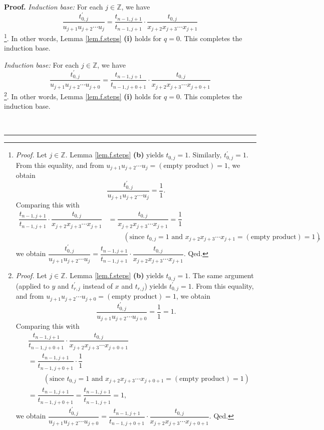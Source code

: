 \documentclass[numbers=enddot,12pt,final,onecolumn,notitlepage]{scrartcl}%
\theoremstyle{definition}
\newenvironment{proof}[1][Proof]{\noindent\textbf{#1.} }{\ \rule{0.5em}{0.5em}}
\newenvironment{verlong}{}{}
\newenvironment{vershort}{}{}
\begin{document}
\begin{proof}
\begin{vershort}
\textit{Induction base:} For each $j\in\mathbb{Z}$, we have%
\[
\dfrac{t_{0,j}^{\prime}}{u_{j+1}u_{j+2}\cdots u_{j}}=\dfrac{t_{n-1,j+1}%
}{t_{n-1,j+1}}\cdot\dfrac{t_{0,j}}{x_{j+2}x_{j+3}\cdots x_{j+1}}%
\]
\footnote{\textit{Proof.} Let $j\in\mathbb{Z}$. Lemma \ref{lem.f.steps}
\textbf{(b)} yields $t_{0,j}=1$. Similarly, $t_{0,j}^{\prime}=1$. From this
equality, and from $u_{j+1}u_{j+2}\cdots u_{j}=\left(  \text{empty
product}\right)  =1$, we obtain%
\[
\dfrac{t_{0,j}^{\prime}}{u_{j+1}u_{j+2}\cdots u_{j}}=\dfrac{1}{1}.
\]
Comparing this with%
\begin{align*}
\dfrac{t_{n-1,j+1}}{t_{n-1,j+1}}\cdot\dfrac{t_{0,j}}{x_{j+2}x_{j+3}\cdots
x_{j+1}}  &  =\dfrac{t_{0,j}}{x_{j+2}x_{j+3}\cdots x_{j+1}}=\dfrac{1}{1}\\
&  \ \ \ \ \ \ \ \ \ \ \left(  \text{since }t_{0,j}=1\text{ and }%
x_{j+2}x_{j+3}\cdots x_{j+1}=\left(  \text{empty product}\right)  =1\right)  ,
\end{align*}
we obtain $\dfrac{t_{0,j}^{\prime}}{u_{j+1}u_{j+2}\cdots u_{j}}=\dfrac
{t_{n-1,j+1}}{t_{n-1,j+1}}\cdot\dfrac{t_{0,j}}{x_{j+2}x_{j+3}\cdots x_{j+1}}$.
Qed.}. In other words, Lemma \ref{lem.f.steps} \textbf{(i)} holds for $q=0$.
This completes the induction base.
\end{vershort}

\begin{verlong}
\textit{Induction base:} For each $j\in\mathbb{Z}$, we have%
\[
\dfrac{t_{0,j}^{\prime}}{u_{j+1}u_{j+2}\cdots u_{j+0}}=\dfrac{t_{n-1,j+1}%
}{t_{n-1,j+0+1}}\cdot\dfrac{t_{0,j}}{x_{j+2}x_{j+3}\cdots x_{j+0+1}}%
\]
\footnote{\textit{Proof.} Let $j\in\mathbb{Z}$. Lemma \ref{lem.f.steps}
\textbf{(b)} yields $t_{0,j}=1$. The same argument (applied to $y$ and
$t_{r,j}^{\prime}$ instead of $x$ and $t_{r,j}$) yields $t_{0,j}^{\prime}=1$.
From this equality, and from $u_{j+1}u_{j+2}\cdots u_{j+0}=\left(  \text{empty
product}\right)  =1$, we obtain%
\[
\dfrac{t_{0,j}^{\prime}}{u_{j+1}u_{j+2}\cdots u_{j+0}}=\dfrac{1}{1}=1.
\]
Comparing this with%
\begin{align*}
&  \dfrac{t_{n-1,j+1}}{t_{n-1,j+0+1}}\cdot\dfrac{t_{0,j}}{x_{j+2}x_{j+3}\cdots
x_{j+0+1}}\\
&  =\dfrac{t_{n-1,j+1}}{t_{n-1,j+0+1}}\cdot\dfrac{1}{1}\\
&  \ \ \ \ \ \ \ \ \ \ \left(  \text{since }t_{0,j}=1\text{ and }%
x_{j+2}x_{j+3}\cdots x_{j+0+1}=\left(  \text{empty product}\right)  =1\right)
\\
&  =\dfrac{t_{n-1,j+1}}{t_{n-1,j+0+1}}=\dfrac{t_{n-1,j+1}}{t_{n-1,j+1}}=1,
\end{align*}
we obtain $\dfrac{t_{0,j}^{\prime}}{u_{j+1}u_{j+2}\cdots u_{j+0}}%
=\dfrac{t_{n-1,j+1}}{t_{n-1,j+0+1}}\cdot\dfrac{t_{0,j}}{x_{j+2}x_{j+3}\cdots
x_{j+0+1}}$. Qed.}. In other words, Lemma \ref{lem.f.steps} \textbf{(i)} holds
for $q=0$. This completes the induction base.
\end{verlong}


\end{proof}
\end{document}
